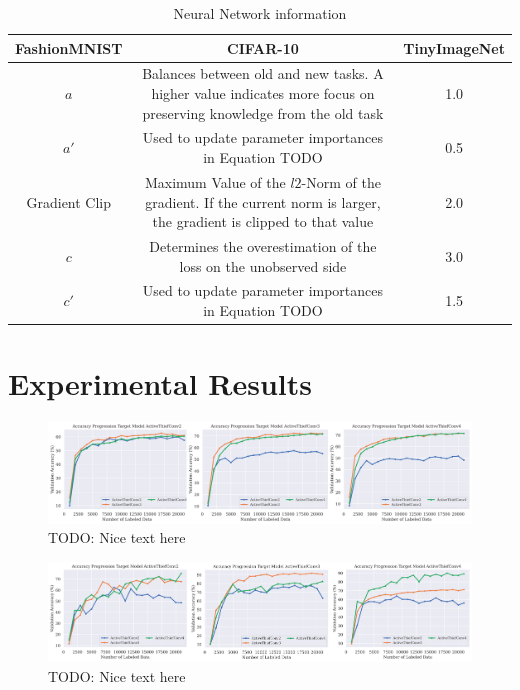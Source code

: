 \begin{table}[h!]
    \centering
    \begin{tabularx}{\textwidth}{c | c c } 
        \hline
         FashionMNIST & CIFAR-10 & TinyImageNet \\ 
        \hline 
        $a$ & Balances between old and new tasks. A higher value indicates more focus
        on preserving knowledge from the old task & 1.0  \\ 
        $a'$ & Used to update parameter importances in Equation TODO & 0.5  \\
        Gradient Clip & Maximum Value of the $l2$-Norm of the gradient. If the current norm is larger, the
        gradient is clipped to that value & 2.0 \\ 
        $c$ & Determines the overestimation of the loss on the unobserved side & 3.0 \\
        $c'$ & Used to update parameter importances in Equation TODO & 1.5 \\
        \hline
    \end{tabularx}
    \caption{Neural Network information}
    \label{fig:NNArchitectures}
\end{table}

\section{Experimental Results}
\label{sec:Appendix:Results}

\begin{figure}[h]
    \centering
    \includegraphics[width=\linewidth]{images/results_CALMS/cifar10_model_comp.png}
    \caption[Agreement Progression for Model Stealing on CIFAR-10 using different ActiveThief models]{TODO: Nice text here}
    \label{fig:CIFAR10modelComp}
\end{figure}

\begin{figure}[h]
    \centering
    \includegraphics[width=\linewidth]{images/results_CALMS/mnist_model_comp.png}
    \caption[Agreement Progression for Model Stealing on MNIST using different ActiveThief models]{TODO: Nice text here}
    \label{fig:MNISTmodelComp}
\end{figure}


